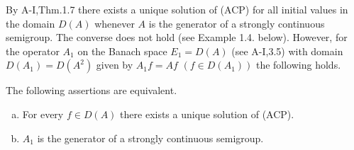 By A-I,Thm.1.7 there exists a unique solution of (ACP) for all initial values in the domain $D(A)$ whenever $A$ is the generator of a strongly continuous semigroup.
The converse does not hold (see Example 1.4. below).
However, for the operator $A_{1}$ on the Banach space $E_{1} = D(A)$ (see A-I,3.5) with domain 
$D(A_{1}) = D(A^{2})$ given by $A_{1}f = Af$ $(f \in D(A_{1}))$ the following holds.
\begin{theorem}\label{thm:a2-1.1}
The following assertions are equivalent.
\begin{enumerate}[(a)]
\item \label{thm:a2-1.1.1}
For every $f \in D(A)$ there exists a unique solution of (ACP).
\item \label{thm:a2-1.1.2}
$A_{1}$ is the generator of a strongly continuous semigroup.
\end{enumerate}
\end{theorem}

